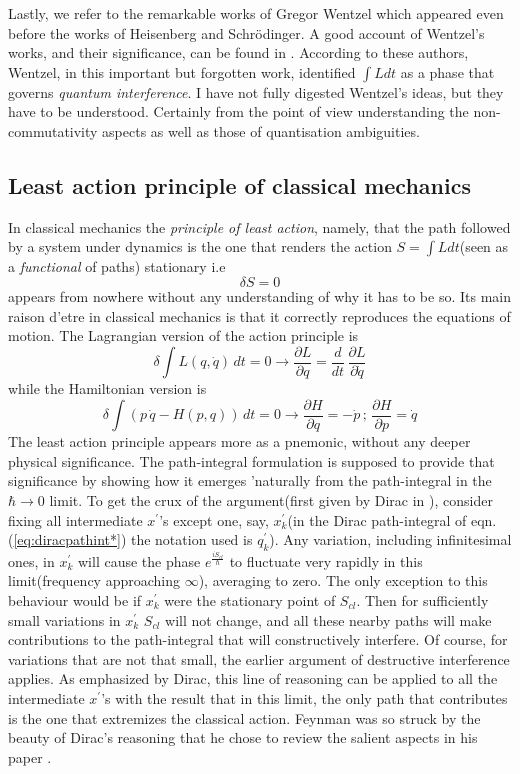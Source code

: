 \documentclass[12pt]{article}
\newcommand{\be}{\begin{equation}}
\newcommand{\ee}{\end{equation}}
\begin{document}
Lastly, we refer to the remarkable works of Gregor Wentzel \cite{wentzel1,wentzel2} which appeared even before the works of Heisenberg and 
Schr\"odinger. A good account of Wentzel's works, and their significance, can be found in \cite{antoci}. According to these authors, Wentzel,
in this important but forgotten work, identified $ \int L dt$ as a phase that governs \emph{quantum interference}. I have not fully
digested Wentzel's ideas, but they have to be understood. Certainly from the point of view understanding the non-commutativity aspects as well
as those of quantisation ambiguities.

\subsection{Least action principle of classical mechanics}
In classical mechanics the {\it principle of least action}, namely, that the path followed by a system under dynamics is the one
that renders the action $S =  \int L dt$(seen as a {\it functional} of paths) stationary i.e
\be
\label{eq:leastactioncm}
\delta S = 0
\ee
appears from nowhere without any understanding of why it has to be so. Its main raison d'etre in classical mechanics is that it correctly
reproduces the equations of motion. The Lagrangian version of the action principle is
\be
\label{eq:eulerlagrange}
\delta  \int L(q,{\dot q})\,dt = 0 \rightarrow \frac{\partial L}{\partial q} = \frac{d}{dt}\,\frac{\partial L}{\partial {\dot q}}
\ee
while the Hamiltonian version is
\be
\label{eq:hamiltoneqns}
\delta  \int (p\,{\dot q} - H(p,q))\,dt = 0 \rightarrow \frac{\partial H}{\partial q} = - {\dot p}\,;\,\frac{\partial H}{\partial p} = {\dot q}
\ee
The least action principle appears more as a pnemonic, without any deeper physical significance. The path-integral formulation is supposed
to provide that significance by showing how it emerges 'naturally from the path-integral in the $\hbar \rightarrow 0$ limit. To get the
crux of the argument(first given by Dirac in \cite{diracpaper}), consider fixing all intermediate $x^\prime$'s except one, say,
$x_k^\prime$(in the Dirac path-integral of eqn.(\ref{eq:diracpathint*}) the notation used is $q_k^\prime$). 
Any variation,
including infinitesimal ones,
in $x_k^\prime$ will cause the phase $e^{\frac{iS_{cl}}{\hbar}}$ to fluctuate very rapidly in this limit(frequency approaching $\infty$), 
averaging to zero.
The only exception to this behaviour would be if $x_k^\prime$ were the stationary point of $S_{cl}$. Then for sufficiently small variations 
in $x_k^\prime$ 
$S_{cl}$ will not change, and all these nearby paths will make contributions to the path-integral that will constructively interfere. 
Of course, for
variations that are not that small, the earlier argument of destructive interference applies. As emphasized by Dirac, this line of
reasoning can be applied to all the intermediate $x^\prime$'s with the result that in this limit, the only path that contributes is the one that
extremizes the classical action. Feynman was so struck by the beauty of Dirac's reasoning that he chose to review the salient aspects in
his paper \cite{feynpaper}.
\end{document}
